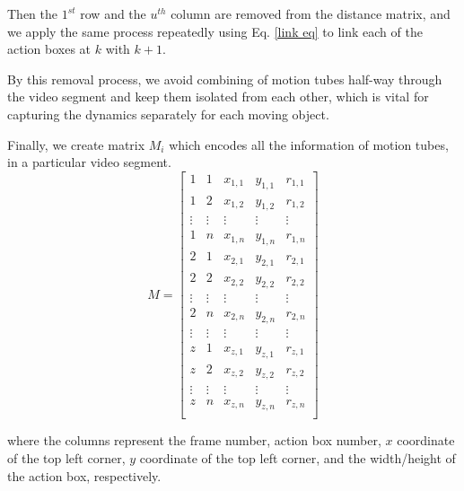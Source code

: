 Then the $1^{st}$ row and the $u^{th}$ column are removed from the distance matrix, and we apply the same process repeatedly using Eq. \ref{link eq}
to link each of the action boxes at $k$ with $k+1$. 

By this removal process, we avoid combining of motion tubes half-way through
the video segment and keep them isolated from each other, which is vital for capturing the dynamics separately for each moving object.




Finally, we create matrix $M_{i}$ which encodes all the information of motion tubes, in a particular video segment.
\begin{equation}
M=\begin{bmatrix}
    1       & 1 & x_{1,1} & y_{1,1} & r_{1,1} \\
    1       & 2 & x_{1,2} & y_{1,2} & r_{1,2} \\
    \vdots       & \vdots & \vdots & \vdots & \vdots \\
    1       & n & x_{1,n} & y_{1,n} & r_{1,n} \\
    2       & 1 & x_{2,1} & y_{2,1} & r_{2,1} \\
    2       & 2 & x_{2,2} & y_{2,2} & r_{2,2} \\
    \vdots       & \vdots & \vdots & \vdots & \vdots \\
    2       & n & x_{2,n} & y_{2,n} & r_{2,n} \\
    \vdots       & \vdots & \vdots & \vdots & \vdots \\
    z       & 1 & x_{z,1} & y_{z,1} & r_{z,1} \\
    z       & 2 & x_{z,2} & y_{z,2} & r_{z,2} \\
    \vdots       & \vdots & \vdots & \vdots & \vdots \\
    z       & n & x_{z,n} & y_{z,n} & r_{z,n} \\

\end{bmatrix}
\end{equation}

where the columns represent the frame number, action box number, $x$ coordinate of the top left corner,
$y$ coordinate of the top left corner, and the width/height of the action box, respectively.

